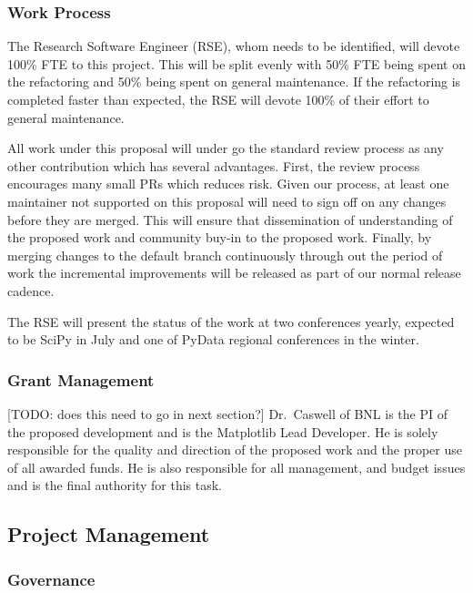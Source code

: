 \documentclass[12pt]{article}
\numberwithin{page}{section}
\begin{document}
\subsubsection{Work Process}

The Research Software Engineer (RSE), whom needs to be identified,
will devote 100\% FTE to this project.  This will be split evenly with
50\% FTE being spent on the refactoring and 50\% being spent on
general maintenance.  If the refactoring is completed faster than
expected, the RSE will devote 100\% of their effort to general
maintenance.


All work under this proposal will under go the standard review process
as any other contribution which has several advantages.  First, the
review process encourages many small PRs which reduces risk.  Given
our process, at least one maintainer not supported on this proposal will
need to sign off on any changes before they are merged.  This will
ensure that dissemination of understanding of the proposed work and
community buy-in to the proposed work.  Finally, by merging changes to
the default branch continuously through out the period of work the
incremental improvements will be released as part of our normal
release cadence.

The RSE will present the status of the work at two conferences yearly,
expected to be SciPy in July and one of PyData regional conferences in
the winter.






\subsubsection{Grant Management}

[TODO: does this need to go in next section?]
Dr.\ Caswell of BNL is the PI of the proposed development and is the
Matplotlib Lead Developer.  He is solely responsible for the quality
and direction of the proposed work and the proper use of all awarded
funds.  He is also responsible for all management, and budget issues
and is the final authority for this task.


\subsection{Project Management}
\subsubsection{Governance}
\end{document}
